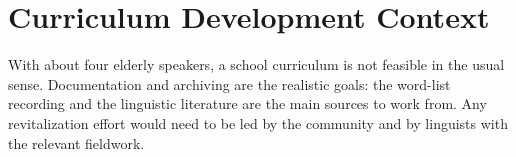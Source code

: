 \documentclass[12pt]{article}
\begin{document}
\section{Curriculum Development Context}
With about four elderly speakers, a school curriculum is not feasible in the usual sense. Documentation and archiving are the realistic goals: the word-list recording and the linguistic literature are the main sources to work from. Any revitalization effort would need to be led by the community and by linguists with the relevant fieldwork.
\end{document}
